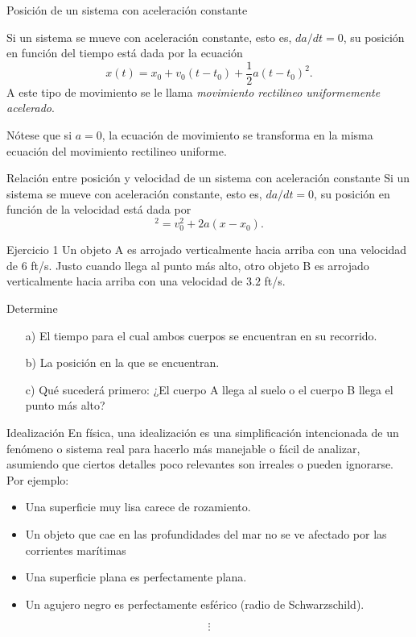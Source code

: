 \begin{frame}{Posición de un sistema con aceleración constante}

Si un sistema se mueve con aceleración constante, esto es, $da/dt=0$, su posición en función del tiempo está dada por la ecuación
    \begin{equation}
        x(t)=x_0+v_0(t-t_0)+\frac{1}{2}a(t-t_0)^2.
    \end{equation}
    A este tipo de movimiento se le llama \textit{movimiento rectilineo uniformemente acelerado}.

    
    Nótese que si $a=0$, la ecuación de movimiento se transforma en la misma ecuación del movimiento rectilineo uniforme.
\end{frame}

\begin{frame}{Relación entre posición y velocidad de un sistema con aceleración constante}
    Si un sistema se mueve con aceleración constante, esto es, $da/dt=0$, su posición en función de la velocidad está dada por \begin{equation}
        [v(x)]^2=v_0^2+2a(x-x_0).
    \end{equation} 
\end{frame}

\begin{frame}{Ejercicio 1}
    Un objeto A es arrojado verticalmente hacia arriba con una velocidad de $6$ ft/s. Justo cuando llega al punto más alto, otro objeto B es arrojado verticalmente hacia arriba con una velocidad de $3.2$ ft/s.
	    
	    Determine
	    
	    \begin{itemize}
	    \item[a)] El tiempo para el cual ambos cuerpos se encuentran en su recorrido.
	    \item[b)] La posición en la que se encuentran.
	    \item[c)] Qué sucederá primero: ¿El cuerpo A llega al suelo o el cuerpo B llega el punto más alto?
	    \end{itemize}
	    
\end{frame}

\begin{frame}{Idealización}
    En física, una idealización es una simplificación intencionada de un fenómeno o sistema real para hacerlo más manejable o fácil de analizar, asumiendo que ciertos detalles poco relevantes son irreales o pueden ignorarse. Por ejemplo: \begin{itemize}
        \item Una superficie muy lisa carece de rozamiento.
        \item Un objeto que cae en las profundidades del mar no se ve afectado por las corrientes marítimas
        \item Una superficie plana es perfectamente plana.
        \item Un agujero negro es perfectamente esférico (radio de Schwarzschild).
    \end{itemize}

    $$\vdots$$
\end{frame}

